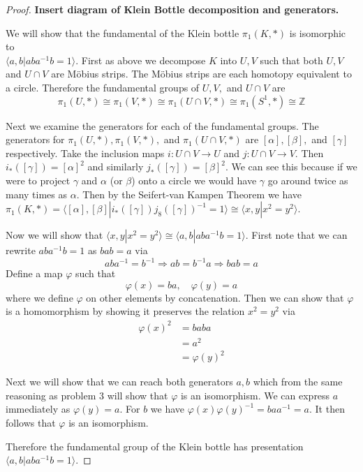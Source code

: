 \documentclass[10pt]{article}
\newcommand{\bb}[1]{\mathbb{#1}}
\theoremstyle{plain}
\theoremstyle{remark}
\begin{document}
\begin{proof}
  \textbf{Insert diagram of Klein Bottle decomposition and generators.}

  We will show that the fundamental of the Klein bottle $\pi_1(K,*)$ is
  isomorphic to \\$\langle a,b|aba^{-1}b=1\rangle$. First as above we decompose
  $K$ into $U,V$ such that both $U,V$ and $U\cap V$ are M\"obius strips.
  The M\"obius strips are each homotopy equivalent to a circle. Therefore
  the fundamental groups of $U,V,$ and $U\cap V$ are
  \[ \pi_1(U,*)\cong \pi_1(V,*)\cong \pi_1(U\cap V,*)\cong \pi_1(S^1,*)\cong\bb{Z}\]

  Next we examine the generators for each of the fundamental groups. The generators
  for $\pi_1(U,*),\pi_1(V,*),$ and $\pi_1(U\cap V,*)$ are $[\alpha],[\beta],$ and $[\gamma]$ respectively.
  Take the inclusion maps $i:U\cap V\rightarrow U$ and $j:U\cap V \rightarrow V$. Then
  $i_*([\gamma])=[\alpha]^2$ and similarly $j_*([\gamma])=[\beta]^2$. We can see this because if we were
  to project $\gamma$ and $\alpha$ (or $\beta$) onto a circle we would have $\gamma$ go around twice as
  many times as $\alpha$. Then by the Seifert-van Kampen Theorem we have
  $\pi_1(K,*)=\langle [\alpha],[\beta] | i_*([\gamma])j_8([\gamma])^{-1}=1 \rangle\cong \langle x,y| x^2=y^2\rangle$.

  Now we will show that $\langle x,y| x^2=y^2\rangle\cong \langle a,b|aba^{-1}b=1\rangle$. First note that we
  can rewrite $aba^{-1}b=1$ as $bab=a$ via
  \[ aba^{-1}=b^{-1}\Rightarrow ab=b^{-1}a\Rightarrow bab=a \]
  Define a map $\varphi$ such that
  \[ \varphi(x)=ba,\quad \varphi(y)=a\]
  where we define $\varphi$ on other elements by concatenation.
  Then we can show that $\varphi$ is a homomorphism by showing it preserves the relation
  $x^2=y^2$ via
  \begin{align*}
    \varphi(x)^2 &= baba\\
          &= a^2\\
          &= \varphi(y)^2
  \end{align*}

  Next we will show that we can reach both generators $a,b$ which from the same reasoning
  as problem $3$ will show that $\varphi$ is an isomorphism. We can express $a$ immediately
  as $\varphi(y)=a$. For $b$ we have $\varphi(x)\varphi(y)^{-1}=baa^{-1}=a$. It then follows that $\varphi$
  is an isomorphism.

  Therefore the fundamental group of the Klein bottle has presentation
  $\langle a,b|aba^{-1}b=1\rangle$.
\end{proof}
\end{document}
